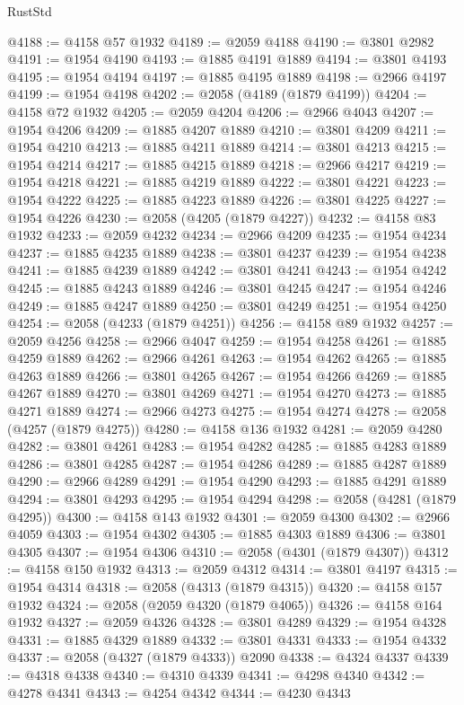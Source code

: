 \begin{lexlean}{RustStd}
\begin{coremodule}
@4188 := @4158 @57 @1932
@4189 := @2059 @4188
@4190 := @3801 @2982
@4191 := @1954 @4190
@4193 := @1885 @4191 @1889
@4194 := @3801 @4193
@4195 := @1954 @4194
@4197 := @1885 @4195 @1889
@4198 := @2966 @4197
@4199 := @1954 @4198
@4202 := @2058 (@4189 (@1879 @4199))
@4204 := @4158 @72 @1932
@4205 := @2059 @4204
@4206 := @2966 @4043
@4207 := @1954 @4206
@4209 := @1885 @4207 @1889
@4210 := @3801 @4209
@4211 := @1954 @4210
@4213 := @1885 @4211 @1889
@4214 := @3801 @4213
@4215 := @1954 @4214
@4217 := @1885 @4215 @1889
@4218 := @2966 @4217
@4219 := @1954 @4218
@4221 := @1885 @4219 @1889
@4222 := @3801 @4221
@4223 := @1954 @4222
@4225 := @1885 @4223 @1889
@4226 := @3801 @4225
@4227 := @1954 @4226
@4230 := @2058 (@4205 (@1879 @4227))
@4232 := @4158 @83 @1932
@4233 := @2059 @4232
@4234 := @2966 @4209
@4235 := @1954 @4234
@4237 := @1885 @4235 @1889
@4238 := @3801 @4237
@4239 := @1954 @4238
@4241 := @1885 @4239 @1889
@4242 := @3801 @4241
@4243 := @1954 @4242
@4245 := @1885 @4243 @1889
@4246 := @3801 @4245
@4247 := @1954 @4246
@4249 := @1885 @4247 @1889
@4250 := @3801 @4249
@4251 := @1954 @4250
@4254 := @2058 (@4233 (@1879 @4251))
@4256 := @4158 @89 @1932
@4257 := @2059 @4256
@4258 := @2966 @4047
@4259 := @1954 @4258
@4261 := @1885 @4259 @1889
@4262 := @2966 @4261
@4263 := @1954 @4262
@4265 := @1885 @4263 @1889
@4266 := @3801 @4265
@4267 := @1954 @4266
@4269 := @1885 @4267 @1889
@4270 := @3801 @4269
@4271 := @1954 @4270
@4273 := @1885 @4271 @1889
@4274 := @2966 @4273
@4275 := @1954 @4274
@4278 := @2058 (@4257 (@1879 @4275))
@4280 := @4158 @136 @1932
@4281 := @2059 @4280
@4282 := @3801 @4261
@4283 := @1954 @4282
@4285 := @1885 @4283 @1889
@4286 := @3801 @4285
@4287 := @1954 @4286
@4289 := @1885 @4287 @1889
@4290 := @2966 @4289
@4291 := @1954 @4290
@4293 := @1885 @4291 @1889
@4294 := @3801 @4293
@4295 := @1954 @4294
@4298 := @2058 (@4281 (@1879 @4295))
@4300 := @4158 @143 @1932
@4301 := @2059 @4300
@4302 := @2966 @4059
@4303 := @1954 @4302
@4305 := @1885 @4303 @1889
@4306 := @3801 @4305
@4307 := @1954 @4306
@4310 := @2058 (@4301 (@1879 @4307))
@4312 := @4158 @150 @1932
@4313 := @2059 @4312
@4314 := @3801 @4197
@4315 := @1954 @4314
@4318 := @2058 (@4313 (@1879 @4315))
@4320 := @4158 @157 @1932
@4324 := @2058 (@2059 @4320 (@1879 @4065))
@4326 := @4158 @164 @1932
@4327 := @2059 @4326
@4328 := @3801 @4289
@4329 := @1954 @4328
@4331 := @1885 @4329 @1889
@4332 := @3801 @4331
@4333 := @1954 @4332
@4337 := @2058 (@4327 (@1879 @4333)) @2090
@4338 := @4324 @4337
@4339 := @4318 @4338
@4340 := @4310 @4339
@4341 := @4298 @4340
@4342 := @4278 @4341
@4343 := @4254 @4342
@4344 := @4230 @4343

\end{coremodule}
\end{lexlean}
